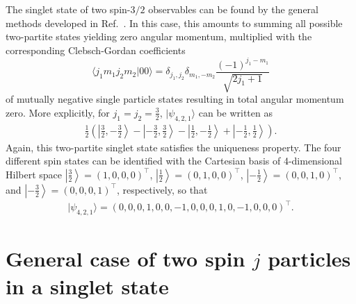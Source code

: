 \documentclass[%
  twocolumn,
 showpacs,
 showkeys,
 preprintnumbers,
 amsmath,amssymb,
 aps,
  pra,
  longbibliography,
 floatfix,
 ]{revtex4-1}
\begin{document}
The singlet state of two spin-$3/2$ observables
can be found by the general methods developed in Ref.~\cite{schimpf-svozil}.
In this case, this amounts to summing all possible two-partite states yielding zero angular momentum,
multiplied with the corresponding  Clebsch-Gordan coefficients
\begin{equation}
\langle j_1m_1j_2m_2\vert 00\rangle = \delta_{j_1,j_2}  \delta_{m_1,-m_2} \frac{(-1)^{j_1-m_1}}{\sqrt{2j_1+1}}
\label{2009-gtq-cgordon0}
\end{equation}
of mutually negative single particle states resulting in total angular momentum zero.
More explicitly,  for $j_1=j_2=\frac{3}{2}$,
$\vert \psi_{4,2,1} \rangle  $ can be written as
\begin{equation}
\begin{split}
\frac{1}{2} \left(
\left| \left. \frac{3}{2}, -\frac{3}{2}\right\rangle \right.
 - \left| \left.  -\frac{3}{2}, \frac{3}{2}\right\rangle    \right.
- \left| \left.  \frac{1}{2}, -\frac{1}{2}\right\rangle  \right.
+ \left| \left.  -\frac{1}{2}, \frac{1}{2}\right\rangle   \right.
\right).
\end{split}
\end{equation}
Again, this two-partite singlet state satisfies the uniqueness property.
The four different spin states can be identified with the Cartesian basis of 4-dimensional Hilbert space
$\left| \left. \frac{3}{2}\right\rangle \right. =
\left( 1,0,0,0\right)^\intercal$,
$\left| \left. \frac{1}{2}\right\rangle \right. = \left(0,1,0,0\right)^\intercal$,
$\left| \left. -\frac{1}{2}\right\rangle \right. = \left(0,0,1,0\right)^\intercal$,
and
$\left| \left. -\frac{3}{2}\right\rangle \right. = \left(0,0,0,1\right)^\intercal$,
respectively, so that
\begin{equation}
\begin{split}
\vert \psi_{4,2,1} \rangle
=
\left( 0,0,0,1,0,0,-1,0,0,0,1,0,-1,0,0,0\right)^\intercal
.
\end{split}
\end{equation}


\section{General case of two spin $j$ particles in a singlet state}
\end{document}

